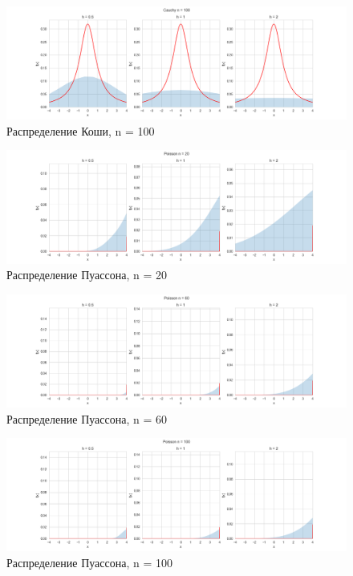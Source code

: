 \documentclass[../main.tex]{subfiles}
\begin{document}
    \begin{figure}[H]
        \centering
        \includegraphics[scale=0.5]{figures/CauchyNuclear100.png}
        \caption{Распределение Коши, n = 100}
        \label{fig:normal}
    \end{figure}
    
    \begin{figure}[H]
        \centering
        \includegraphics[scale=0.5]{figures/PoissonNuclear20.png}
        \caption{Распределение Пуассона, n = 20}
        \label{fig:normal}
    \end{figure}
    
    \begin{figure}[H]
        \centering
        \includegraphics[scale=0.5]{figures/PoissonNuclear60.png}
        \caption{Распределение Пуассона, n = 60}
        \label{fig:normal}
    \end{figure}
    
    \begin{figure}[H]
        \centering
        \includegraphics[scale=0.5]{figures/PoissonNuclear100.png}
        \caption{Распределение Пуассона, n = 100}
        \label{fig:normal}
    \end{figure}
    
\end{document}
